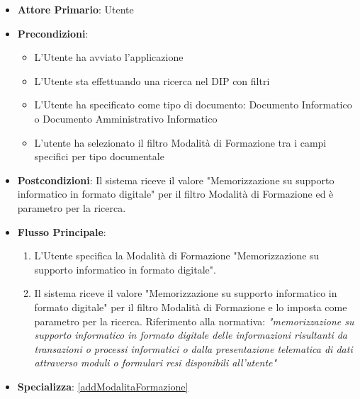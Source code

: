 \begin{itemize}
      \item \textbf{Attore Primario}: Utente
      \item \textbf{Precondizioni}: 
      \begin{itemize}
            \item L'Utente ha avviato l'applicazione
            \item L'Utente sta effettuando una ricerca nel DIP con filtri
            \item L'Utente ha specificato come tipo di documento: Documento Informatico o Documento Amministrativo Informatico
            \item L'utente ha selezionato il filtro Modalità di Formazione tra i campi specifici per tipo documentale
      \end{itemize}
      \item \textbf{Postcondizioni}: Il sistema riceve il valore "Memorizzazione su supporto informatico in formato digitale" per il filtro Modalità di Formazione ed è parametro per la ricerca.
      \item \textbf{Flusso Principale}:
      \begin{enumerate}
            \item L'Utente specifica la Modalità di Formazione "Memorizzazione su supporto informatico in formato digitale".
            \item Il sistema riceve il valore "Memorizzazione su supporto informatico in formato digitale" per il filtro Modalità di Formazione e lo imposta come parametro per la ricerca. Riferimento alla normativa: \textit{"memorizzazione su supporto informatico in formato digitale delle informazioni risultanti da transazioni o processi informatici o dalla presentazione telematica di dati attraverso moduli o formulari resi disponibili all'utente"}
      \end{enumerate}
      \item \textbf{Specializza}: \ref{addModalitaFormazione}
\end{itemize}

